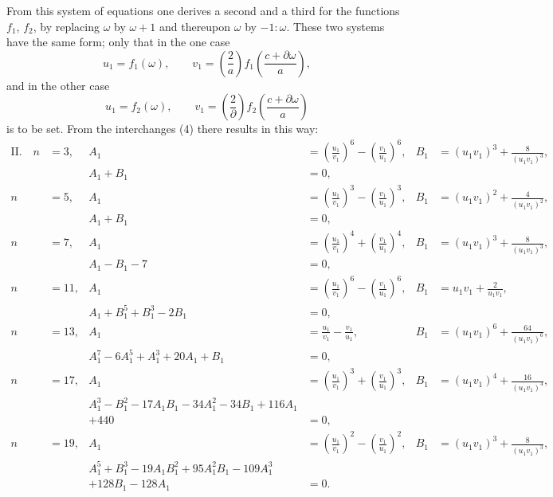 From this system of equations one derives a second and a
third for the functions $f_1$, $f_2$, by replacing $\omega$ by
$\omega + 1$ and thereupon $\omega$ by $-1:\omega$. These two systems
have the same form; only that in the one case
\[
u_1 = f_1(\omega), \qquad v_1 = \left(\frac{2}{a}\right) f_1\left(\frac{c+\partial\omega}{a}\right),
\]
and in the other case
\[
u_1 = f_2(\omega), \qquad v_1 = \left(\frac{2}{\partial}\right) f_2\left(\frac{c+\partial\omega}{a}\right)
\]
is to be set. From the interchanges (4) there results in this way:
{\small
\[
\begin{aligned}
\text{II.}\quad n &= 3, & A_1 &= \left(\frac{u_1}{v_1}\right)^6 - \left(\frac{v_1}{u_1}\right)^6, & B_1 &= (u_1v_1)^3 + \frac{8}{(u_1v_1)^3}, \\
& & A_1 + B_1 &= 0, \\
n &= 5, & A_1 &= \left(\frac{u_1}{v_1}\right)^3 - \left(\frac{v_1}{u_1}\right)^3, & B_1 &= (u_1v_1)^2 + \frac{4}{(u_1v_1)^2}, \\
& & A_1 + B_1 &= 0, \\
n &= 7, & A_1 &= \left(\frac{u_1}{v_1}\right)^4 + \left(\frac{v_1}{u_1}\right)^4, & B_1 &= (u_1v_1)^3 + \frac{8}{(u_1v_1)^3}, \\
& & A_1 - B_1 - 7 &= 0, \\
n &= 11, & A_1 &= \left(\frac{u_1}{v_1}\right)^6 - \left(\frac{v_1}{u_1}\right)^6, & B_1 &= u_1v_1 + \frac{2}{u_1v_1}, \\
& & A_1 + B_1^5 + B_1^3 - 2B_1 &= 0, \\
n &= 13, & A_1 &= \frac{u_1}{v_1} - \frac{v_1}{u_1}, & B_1 &= (u_1v_1)^6 + \frac{64}{(u_1v_1)^6}, \\
& & A_1^7 - 6A_1^5 + A_1^3 + 20A_1 + B_1 &= 0, \\
n &= 17, & A_1 &= \left(\frac{u_1}{v_1}\right)^3 + \left(\frac{v_1}{u_1}\right)^3, & B_1 &= (u_1v_1)^4 + \frac{16}{(u_1v_1)^4}, \\
& & A_1^3 - B_1^2 - 17A_1B_1 - 34A_1^2 - 34B_1 + 116A_1 \\
& & + 440 &= 0, \\
n &= 19, & A_1 &= \left(\frac{u_1}{v_1}\right)^2 - \left(\frac{v_1}{u_1}\right)^2, & B_1 &= (u_1v_1)^3 + \frac{8}{(u_1v_1)^3}, \\
& & A_1^5 + B_1^3 - 19A_1B_1^2 + 95A_1^2B_1 - 109A_1^3 \\
& & + 128B_1 - 128A_1 &= 0.
\end{aligned}
\]
}
